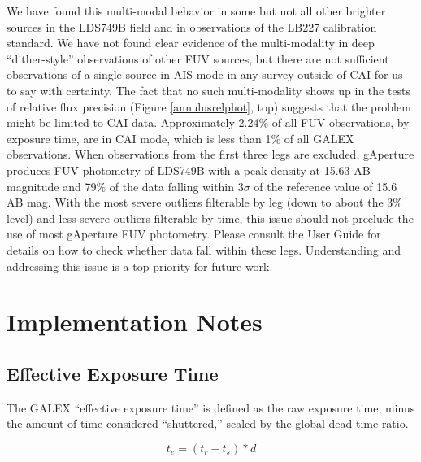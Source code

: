 \documentclass[iop]{emulateapj}
\begin{document}
We have found this multi-modal behavior in some but not all other brighter sources in the LDS749B field and in observations of the LB227 calibration standard. We have not found clear evidence of the multi-modality in deep ``dither-style'' observations of other FUV sources, but there are not sufficient observations of a single source in AIS-mode in any survey outside of CAI for us to say with certainty. The fact that no such multi-modality shows up in the tests of relative flux precision (Figure \ref{annulusrelphot}, top) suggests that the problem might be limited to CAI data. Approximately 2.24\% of all FUV observations, by exposure time, are in CAI mode, which is less than 1\% of all GALEX observations. When observations from the first three legs are excluded, gAperture produces FUV photometry of LDS749B with a peak density at 15.63 AB magnitude and 79\% of the data falling within 3$\sigma$ of the reference value of 15.6 AB mag. With the most severe outliers filterable by leg (down to about the $3$\% level) and less severe outliers filterable by time, this issue should not preclude the use of most gAperture FUV photometry. Please consult the User Guide for details on how to check whether data fall within these legs. Understanding and addressing this issue is a top priority for future work.

\section{Implementation Notes}
\label{implementation}

\subsection{Effective Exposure Time}
\label{effexptime}
The GALEX ``effective exposure time'' is defined as the raw exposure time, minus the amount of time considered ``shuttered,'' scaled by the global dead time ratio.

\[t_e=(t_r-t_s)*d\]
\end{document}
